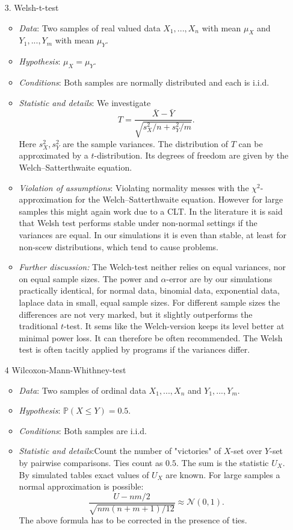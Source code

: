 \documentclass[12pt,a4paper]{amsart}
\theoremstyle{definition}
\theoremstyle{remark}
\numberwithin{equation}{section}
\begin{document}
\begin{itemize}
\item[3.] Welsh-t-test
\begin{itemize}
\item \textit{Data}:  Two samples of real valued data $X_1,...,X_n$ with mean $\mu_X$ and $Y_1,...,Y_m$ with mean $\mu_Y$.
\item \textit{Hypothesis}: $\mu_X=\mu_Y$. 
\item \textit{Conditions}: Both samples are normally distributed and each is i.i.d.
\item \textit{Statistic and details}: We investigate
$$T= \frac{\bar{X}-\bar{Y}}{\sqrt{s_X^2/n+s_Y^2/m}}.$$
Here $s_X^2, s_Y^2$ are the sample variances.
 The distribution of $T$ can be approximated by a $t$-distribution. Its degrees of freedom are given by the Welch–Satterthwaite equation. 
\item \textit{Violation of assumptions}:
Violating normality messes with the $\chi^2$-approximation for the Welch–Satterthwaite equation. However for large samples this might again work due to a CLT. In the literature it is said that Welsh test performs stable under non-normal settings if the variances are equal. In our simulations it is even than stable, at least for non-scew distributions, which tend to cause problems.
\item \textit{Further discussion:} The Welch-test neither relies on equal variances, nor on equal sample sizes. The power and $\alpha$-error are by our simulations practically identical, for normal data, binomial data, exponential data, laplace data in small, equal sample sizes. For different sample sizes the differences are not very marked, but it slightly outperforms the traditional $t$-test. It sems like the Welch-version keeps its level better at minimal power loss. It can therefore be often recommended. The Welsh test is often tacitly applied by programs if the variances differ. \\
\end{itemize}
\item[4] Wilcoxon-Mann-Whithney-test
\begin{itemize}
\item \textit{Data}:  Two samples of ordinal data $X_1,...,X_n$ and $Y_1,...,Y_m$.
\item \textit{Hypothesis}: $\mathbb{P}(X \le Y) = 0.5$.
\item \textit{Conditions}: Both samples are  i.i.d.
\item \textit{Statistic and details}:Count the number of "victories" of $X$-set over $Y$-set by pairwise comparisons. Ties count as $0.5$. The sum is the statistic $U_X$. By simulated tables exact values of $U_X$ are known. For large samples a normal approximation is possible:
$$ \frac{U-nm/2}{\sqrt{nm(n+m+1)/12}}\approx \mathcal{N}(0,1).$$
The above formula has to be corrected in the presence of ties. 


\end{itemize}
\end{itemize}
\end{document}
